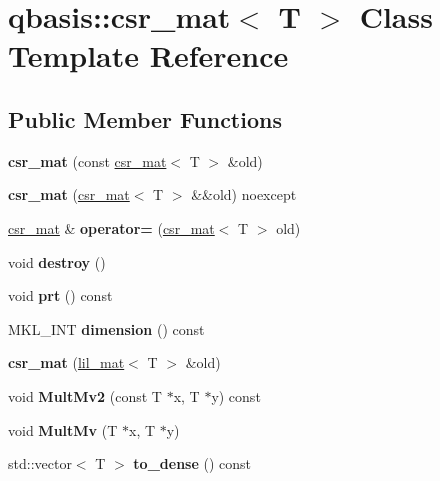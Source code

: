 \hypertarget{classqbasis_1_1csr__mat}{}\section{qbasis\+:\+:csr\+\_\+mat$<$ T $>$ Class Template Reference}
\label{classqbasis_1_1csr__mat}
\subsection*{Public Member Functions}
\begin{DoxyCompactItemize}
\item 
\mbox{\label{classqbasis_1_1csr__mat_add0b7c0820d64b64260716d4a3249de2}} 
{\bfseries csr\+\_\+mat} (const \hyperlink{classqbasis_1_1csr__mat}{csr\+\_\+mat}$<$ T $>$ \&old)
\item 
\mbox{\label{classqbasis_1_1csr__mat_a29dae23cba4b0b0732eb562b2e208778}} 
{\bfseries csr\+\_\+mat} (\hyperlink{classqbasis_1_1csr__mat}{csr\+\_\+mat}$<$ T $>$ \&\&old) noexcept
\item 
\mbox{\label{classqbasis_1_1csr__mat_a0f3c250895013daa2907c7e2c29ca526}} 
\hyperlink{classqbasis_1_1csr__mat}{csr\+\_\+mat} \& {\bfseries operator=} (\hyperlink{classqbasis_1_1csr__mat}{csr\+\_\+mat}$<$ T $>$ old)
\item 
\mbox{\label{classqbasis_1_1csr__mat_ac05e6b508777492b6684187cec31e1b0}} 
void {\bfseries destroy} ()
\item 
\mbox{\label{classqbasis_1_1csr__mat_afe3d8ab48d58e45f460a3d9e6b05fe5e}} 
void {\bfseries prt} () const
\item 
\mbox{\label{classqbasis_1_1csr__mat_a802a58cd7055f0ecd0cd72d1bf09e546}} 
M\+K\+L\+\_\+\+I\+NT {\bfseries dimension} () const
\item 
\mbox{\label{classqbasis_1_1csr__mat_a3cb1072883b0336c34558a4573f45b57}} 
{\bfseries csr\+\_\+mat} (\hyperlink{classqbasis_1_1lil__mat}{lil\+\_\+mat}$<$ T $>$ \&old)
\item 
\mbox{\label{classqbasis_1_1csr__mat_a3097ca44bd1187580883d265027aaf73}} 
void {\bfseries Mult\+Mv2} (const T $\ast$x, T $\ast$y) const
\item 
\mbox{\label{classqbasis_1_1csr__mat_a8f9f5dfbec145283e035bdf172988763}} 
void {\bfseries Mult\+Mv} (T $\ast$x, T $\ast$y)
\item 
\mbox{\label{classqbasis_1_1csr__mat_ae0a2ca8b60f5426e9bcb1a225e24e54a}} 
std\+::vector$<$ T $>$ {\bfseries to\+\_\+dense} () const
\end{DoxyCompactItemize}
